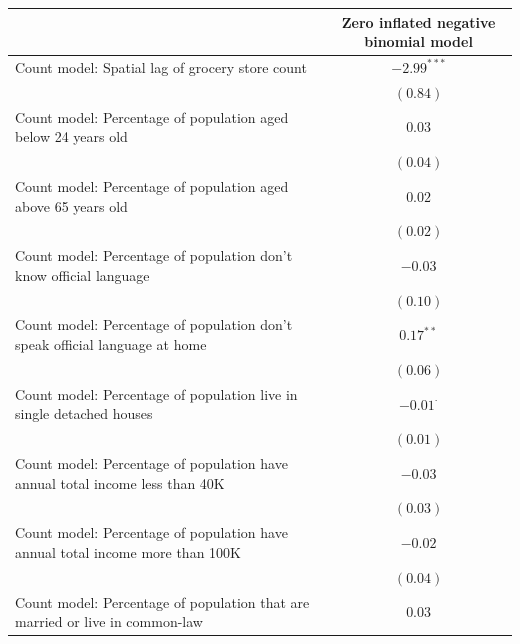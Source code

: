 \documentclass[preprint, 3p,
authoryear]{elsarticle} %
\begin{document}
\begin{table}
\begin{center}
\begin{footnotesize}
\begin{tabular}{l c}
\hline
 & Zero inflated negative binomial model \\
\hline
Count model: Spatial lag of grocery store count                               & $-2.99^{***}$   \\
                                                                              & $(0.84)$        \\
Count model: Percentage of population aged below 24 years old                 & $0.03$          \\
                                                                              & $(0.04)$        \\
Count model: Percentage of population aged above 65 years old                 & $0.02$          \\
                                                                              & $(0.02)$        \\
Count model: Percentage of population don't know official language            & $-0.03$         \\
                                                                              & $(0.10)$        \\
Count model: Percentage of population don't speak official language at home   & $0.17^{**}$     \\
                                                                              & $(0.06)$        \\
Count model: Percentage of population live in single detached houses          & $-0.01^{\cdot}$ \\
                                                                              & $(0.01)$        \\
Count model: Percentage of population have annual total income less than 40K  & $-0.03$         \\
                                                                              & $(0.03)$        \\
Count model: Percentage of population have annual total income more than 100K & $-0.02$         \\
                                                                              & $(0.04)$        \\
Count model: Percentage of population that are married or live in common-law  & $0.03$          \\

\end{tabular}
\end{footnotesize}
\end{center}
\end{table}
\end{document}
